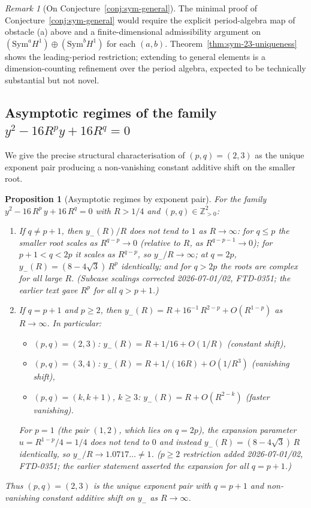 \documentclass[11pt]{article}
\newtheorem{proposition}[theorem]{Proposition}
\theoremstyle{definition}
\theoremstyle{remark}
\newtheorem*{remark}{Remark}
\newcommand{\Z}{\mathbb{Z}}
\begin{document}
\begin{remark}[On Conjecture~\ref{conj:sym-general}]
\label{rem:sym-general-status}
The minimal proof of Conjecture~\ref{conj:sym-general} would require
the explicit period-algebra map of obstacle (a) above and a
finite-dimensional admissibility argument on $(\mathrm{Sym}^{a}H^{1}) \oplus
(\mathrm{Sym}^{b}H^{1})$ for each $(a, b)$. Theorem~\ref{thm:sym-23-uniqueness}
shows the leading-period restriction; extending to general elements is
a dimension-counting refinement over the period algebra, expected to be
technically substantial but not novel.
\end{remark}



\subsection{Asymptotic regimes of the family $y^{2} - 16 R^{p} y + 16 R^{q} = 0$}\label{sec:23-unique}

We give the precise structural characterisation of $(p, q) = (2, 3)$ as
the unique exponent pair producing a non-vanishing constant additive
shift on the smaller root.

\begin{proposition}[Asymptotic regimes by exponent pair]\label{prop:exponent-regimes}
For the family $y^2 - 16\,R^p\,y + 16\,R^q = 0$ with $R > 1/4$ and
$(p, q) \in \Z_{>0}^2$:
\begin{enumerate}[label=\textup{(\roman*)}, leftmargin=*, itemsep=2pt]
\item If $q \neq p+1$, then $y_-(R)/R$ does \emph{not} tend to $1$ as
$R \to \infty$: for $q \leq p$ the smaller root scales as $R^{q-p} \to 0$
(relative to $R$, as $R^{q-p-1} \to 0$); for $p+1 < q < 2p$ it scales as
$R^{q-p}$, so $y_-/R \to \infty$; at $q = 2p$,
$y_-(R) = (8 - 4\sqrt3)\,R^{p}$ identically; and for $q > 2p$ the roots
are complex for all large $R$. \emph{(Subcase scalings corrected
2026-07-01/02, FTD-0351; the earlier text gave $R^{p}$ for all
$q > p+1$.)}
\item If $q = p+1$ and $p \geq 2$, then
$y_-(R) = R + 16^{-1}\,R^{2-p} + O(R^{1-p})$ as
$R \to \infty$. In particular:
   \begin{itemize}[leftmargin=*, itemsep=2pt]
   \item $(p, q) = (2, 3)$: $y_-(R) = R + 1/16 + O(1/R)$ (constant shift),
   \item $(p, q) = (3, 4)$: $y_-(R) = R + 1/(16R) + O(1/R^3)$ (vanishing shift),
   \item $(p, q) = (k, k+1)$, $k \geq 3$: $y_-(R) = R + O(R^{2-k})$ (faster vanishing).
   \end{itemize}
For $p = 1$ (the pair $(1, 2)$, which lies on $q = 2p$), the expansion
parameter $u = R^{1-p}/4 = 1/4$ does not tend to $0$ and instead
$y_-(R) = (8 - 4\sqrt3)\,R$ identically, so $y_-/R \to 1.0717\ldots \neq 1$.
\emph{($p \geq 2$ restriction added 2026-07-01/02, FTD-0351; the earlier
statement asserted the expansion for all $q = p+1$.)}
\end{enumerate}
Thus $(p, q) = (2, 3)$ is the unique exponent pair with $q = p+1$ and
\emph{non-vanishing constant additive shift} on $y_-$ as $R \to \infty$.
\end{proposition}
\end{document}
